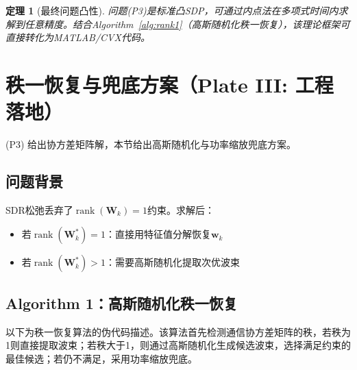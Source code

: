 \documentclass[12pt,a4paper]{article}
\newtheorem{theorem}{定理}
\newcommand{\vect}[1]{\mathbf{#1}}
\newcommand{\mat}[1]{\mathbf{#1}}
\DeclareMathOperator{\rank}{rank}
\begin{document}
\begin{theorem}[最终问题凸性]
问题(P3)是标准凸SDP，可通过内点法在多项式时间内求解到任意精度。结合Algorithm~\ref{alg:rank1}（高斯随机化秩一恢复），该理论框架可直接转化为MATLAB/CVX代码。
\end{theorem}

\section{秩一恢复与兜底方案（Plate III: 工程落地）}

(P3) 给出协方差矩阵解，本节给出高斯随机化与功率缩放兜底方案。

\subsection{问题背景}

SDR松弛丢弃了$\rank(\mat{W}_k) = 1$约束。求解后：
\begin{itemize}
    \item 若$\rank(\mat{W}_k^*) = 1$：直接用特征值分解恢复$\vect{w}_k$
    \item 若$\rank(\mat{W}_k^*) > 1$：需要高斯随机化提取次优波束
\end{itemize}

\subsection{Algorithm 1：高斯随机化秩一恢复}

以下为秩一恢复算法的伪代码描述。该算法首先检测通信协方差矩阵的秩，若秩为1则直接提取波束；若秩大于1，则通过高斯随机化生成候选波束，选择满足约束的最佳候选；若仍不满足，采用功率缩放兜底。
\end{document}
